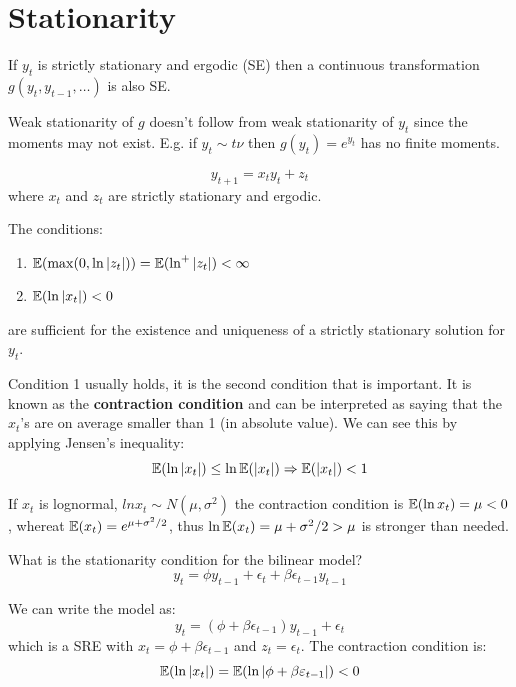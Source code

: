 \documentclass[DIV=14,titlepage=false]{scrreprt}
\begin{document}
\section{Stationarity}
\begin{theorem}
If $y_t$ is strictly stationary and ergodic (SE) then a continuous transformation $g(y_t, y_{t-1}, \dots)$ is also SE. 
\end{theorem}
Weak stationarity of $g$ doesn't follow from weak stationarity of $y_t$ since the moments may not exist. E.g. if $y_t \sim t \nu$ then $g(y_t) = e^{y_t}$ has no finite moments.
\begin{definition}
    \[
        y_{t+1} = x_t y_t + z_t 
    \]
    where $x_t$ and $z_t$ are strictly stationary and ergodic.
\end{definition}
\begin{theorem}
    The conditions:
    \begin{enumerate}
        \item $\mathbb{E}(\max(0, \ln |z_t|)) = \mathbb{E}(\ln ^+ |z_t|) < \infty$
        \item $\mathbb{E}(\ln|x_t|) < 0$
    \end{enumerate}
    are sufficient for the existence and uniqueness of a strictly stationary solution for $y_t$.
\end{theorem}
Condition 1 usually holds, it is the second condition that is important. It is known as the \textbf{contraction condition} and can be interpreted as saying that the $x_t$'s are on average smaller than 1 (in absolute value). We can see this by applying Jensen's inequality:
\[
    \mathbb{E}(\ln|x_t|) \leq \ln \mathbb{E}(|x_t|) \Rightarrow \mathbb{E}(|x_t|) < 1
\]
\begin{example}
    If $x_t$ is lognormal, $ln x_t \sim N(\mu, \sigma^2)$ the contraction condition is $\mathbb{E}(\ln x_t) = \mu < 0$, whereat $\mathbb{E}(x_t) = e^{\mu + \sigma^2/2}$, thus $\ln \mathbb{E}(x_t) = \mu + \sigma^2/2 > \mu$ is stronger than needed.
\end{example}
\begin{exercise}
    What is the stationarity condition for the bilinear model?
    \begin{equation}
        \label{eq:bilinear} y_t = \phi y_{t-1} + \epsilon_t + \beta \epsilon_{t-1} y_{t-1}
    \end{equation}
\end{exercise}
\begin{solution}
    We can write the model as:
    \[
        y_t= (\phi + \beta \epsilon_{t-1})y_{t-1} + \epsilon_t
    \]
    which is a SRE with $x_t = \phi + \beta \epsilon_{t-1}$ and $z_t = \epsilon_t$. The contraction condition is:
    \[
        \mathbb{E}(\ln|x_t|) = \mathbb{E}(\ln|\phi + \beta \varepsilon_{t-1}|) < 0
    \]
\end{solution}
\end{document}
